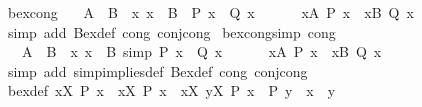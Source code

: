 \begin{isabellebody}
\ bex{\isacharunderscore}{\kern0pt}cong{\isacharcolon}{\kern0pt}\isanewline
\ \ {\isachardoublequoteopen}{\isasymlbrakk}\ A\ {\isacharequal}{\kern0pt}\ B{\isacharsemicolon}{\kern0pt}\ \ {\isasymAnd}x{\isachardot}{\kern0pt}\ x\ {\isasymin}\ B\ {\isasymLongrightarrow}\ P\ x\ {\isasymlongleftrightarrow}\ Q\ x\ {\isasymrbrakk}\ {\isasymLongrightarrow}\isanewline
\ \ \ \ {\isacharparenleft}{\kern0pt}{\isasymexists}x{\isasymin}A{\isachardot}{\kern0pt}\ P\ x{\isacharparenright}{\kern0pt}\ {\isasymlongleftrightarrow}\ {\isacharparenleft}{\kern0pt}{\isasymexists}x{\isasymin}B{\isachardot}{\kern0pt}\ Q\ x{\isacharparenright}{\kern0pt}{\isachardoublequoteclose}\isanewline
%
\isadelimproof
%
\endisadelimproof
%
\isatagproof
{}\isamarkupfalse%
\ {\isacharparenleft}{\kern0pt}simp\ add{\isacharcolon}{\kern0pt}\ Bex{\isacharunderscore}{\kern0pt}def\ cong{\isacharcolon}{\kern0pt}\ conj{\isacharunderscore}{\kern0pt}cong{\isacharparenright}{\kern0pt}%
\endisatagproof
{\isafoldproof}%
%
\isadelimproof
\isanewline
%
\endisadelimproof
\isanewline
{}\isamarkupfalse%
\ bex{\isacharunderscore}{\kern0pt}cong{\isacharunderscore}{\kern0pt}simp\ {\isacharbrackleft}{\kern0pt}cong{\isacharbrackright}{\kern0pt}{\isacharcolon}{\kern0pt}\isanewline
\ \ {\isachardoublequoteopen}{\isasymlbrakk}\ A\ {\isacharequal}{\kern0pt}\ B{\isacharsemicolon}{\kern0pt}\ \ {\isasymAnd}x{\isachardot}{\kern0pt}\ x\ {\isasymin}\ B\ {\isacharequal}{\kern0pt}simp{\isacharequal}{\kern0pt}{\isachargreater}{\kern0pt}\ P\ x\ {\isasymlongleftrightarrow}\ Q\ x\ {\isasymrbrakk}\ {\isasymLongrightarrow}\isanewline
\ \ \ \ {\isacharparenleft}{\kern0pt}{\isasymexists}x{\isasymin}A{\isachardot}{\kern0pt}\ P\ x{\isacharparenright}{\kern0pt}\ {\isasymlongleftrightarrow}\ {\isacharparenleft}{\kern0pt}{\isasymexists}x{\isasymin}B{\isachardot}{\kern0pt}\ Q\ x{\isacharparenright}{\kern0pt}{\isachardoublequoteclose}\isanewline
%
\isadelimproof
%
\endisadelimproof
%
\isatagproof
{}\isamarkupfalse%
\ {\isacharparenleft}{\kern0pt}simp\ add{\isacharcolon}{\kern0pt}\ simp{\isacharunderscore}{\kern0pt}implies{\isacharunderscore}{\kern0pt}def\ Bex{\isacharunderscore}{\kern0pt}def\ cong{\isacharcolon}{\kern0pt}\ conj{\isacharunderscore}{\kern0pt}cong{\isacharparenright}{\kern0pt}%
\endisatagproof
{\isafoldproof}%
%
\isadelimproof
\isanewline
%
\endisadelimproof
\isanewline
{}\isamarkupfalse%
\ bex{}{\isacharunderscore}{\kern0pt}def{\isacharcolon}{\kern0pt}\ {\isachardoublequoteopen}{\isacharparenleft}{\kern0pt}{\isasymexists}{\isacharbang}{\kern0pt}x{\isasymin}X{\isachardot}{\kern0pt}\ P\ x{\isacharparenright}{\kern0pt}\ {\isasymlongleftrightarrow}\ {\isacharparenleft}{\kern0pt}{\isasymexists}x{\isasymin}X{\isachardot}{\kern0pt}\ P\ x{\isacharparenright}{\kern0pt}\ {\isasymand}\ {\isacharparenleft}{\kern0pt}{\isasymforall}x{\isasymin}X{\isachardot}{\kern0pt}\ {\isasymforall}y{\isasymin}X{\isachardot}{\kern0pt}\ P\ x\ {\isasymlongrightarrow}\ P\ y\ {\isasymlongrightarrow}\ x\ {\isacharequal}{\kern0pt}\ y{\isacharparenright}{\kern0pt}{\isachardoublequoteclose}\isanewline

\end{isabellebody}

